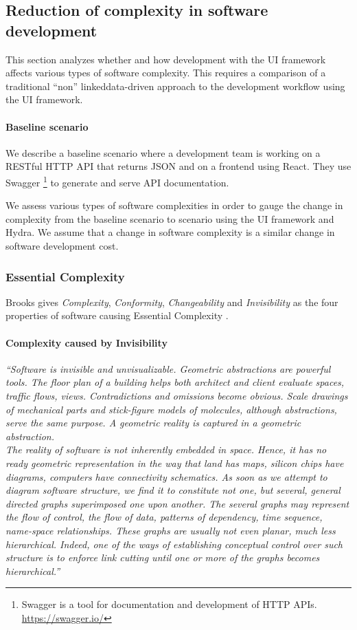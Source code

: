 \subsection{Reduction of complexity in software development}
This section analyzes whether and how development with the UI framework affects various types of software complexity. This requires a comparison of a traditional ``non'' \gls{linkeddata}-driven approach to the development workflow using the UI framework.

\paragraph{Baseline scenario} We describe a baseline scenario where a development team is working on a RESTful HTTP API that returns JSON and on a \gls{frontend} using React. They use Swagger \footnote{Swagger is a tool for documentation and development of HTTP APIs. \url{https://swagger.io/}} to generate and serve API documentation.

We assess various types of software complexities in order to gauge the change in complexity from the baseline scenario to scenario using the UI framework and Hydra. We assume that a change in software complexity is a similar change in software development cost.

\subsubsection{Essential Complexity}
Brooks gives \textit{Complexity}, \textit{Conformity}, \textit{Changeability} and \textit{Invisibility} as the four properties of software causing Essential Complexity \citep{nosilverbullet}.

\paragraph{Complexity caused by Invisibility}
\textit{``Software is invisible and unvisualizable. Geometric abstractions are powerful tools. The floor plan of a building helps both architect and client evaluate spaces, traffic flows, views. Contradictions and omissions become obvious. Scale drawings of mechanical parts and stick-figure models of molecules, although abstractions, serve the same purpose. A geometric reality is captured in a geometric abstraction. \\ The reality of software is not inherently embedded in space. Hence, it has no ready geometric representation in the way that land has maps, silicon chips have diagrams, computers have connectivity schematics. As soon as we attempt to diagram software structure, we find it to constitute not one, but several, general directed graphs superimposed one upon another. The several graphs may represent the flow of control, the flow of data, patterns of dependency, time sequence, name-space relationships. These graphs are usually not even planar, much less hierarchical. Indeed, one of the ways of establishing conceptual control over such structure is to enforce link cutting until one or more of the graphs becomes hierarchical.''} \citep[p.~4]{nosilverbullet}

